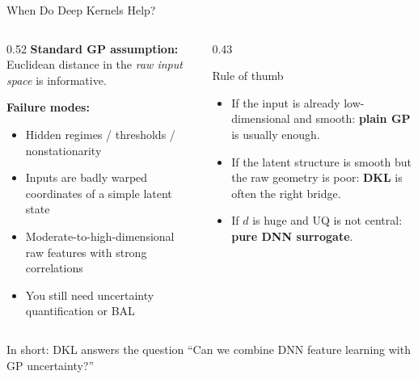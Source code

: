 \documentclass[aspectratio=169,11pt]{beamer}
\newcommand{\emphc}[1]{\textcolor{harvardcrimson}{#1}}
\begin{document}
\begin{frame}{When Do Deep Kernels Help?}
\begin{columns}[T]
\begin{column}{0.52\textwidth}
\textbf{Standard GP assumption:} Euclidean distance in the \emph{raw input space} is informative.

\vspace{0.2cm}
\textbf{Failure modes:}
\begin{itemize}
  \item Hidden regimes / thresholds / nonstationarity
  \item Inputs are badly warped coordinates of a simple latent state
  \item Moderate-to-high-dimensional raw features with strong correlations
  \item You still need \emphc{uncertainty quantification} or BAL
\end{itemize}
\end{column}

\begin{column}{0.43\textwidth}
\begin{alertblock}{Rule of thumb}
\begin{itemize}
  \item If the input is already low-dimensional and smooth: \textbf{plain GP} is usually enough.
  \item If the latent structure is smooth but the raw geometry is poor: \textbf{DKL} is often the right bridge.
  \item If $d$ is huge and UQ is not central: \textbf{pure DNN surrogate}.
\end{itemize}
\end{alertblock}
\end{column}
\end{columns}

\vspace{0.2cm}
{\small In short: \emphc{DKL answers the question ``Can we combine DNN feature learning with GP uncertainty?''}}
\end{frame}
\end{document}
